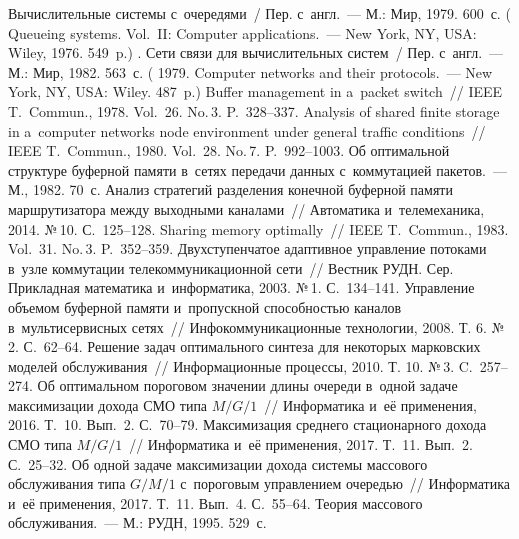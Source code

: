 \begin{multicols}{2}
{\small\frenchspacing
 {%
 \begin{thebibliography}{99}
 Вычислительные системы с~очередями~/ Пер. с~англ.~--- М.: 
Мир, 1979. 600~с. 
( {Queueing systems. Vol.~II: Computer applications}.~--- 
New York, NY, USA: Wiley, 1976. 549~p.)
. 
Сети связи для вычислительных систем~/ Пер. с~англ.~--- 
М.: Мир, 1982. 563~с. 
( 1979. 
{Computer networks and their protocols}.~--- New York, NY, USA: Wiley. 487~p.)
 Buffer management in a~packet switch~// IEEE T.~Commun., 
1978. Vol.~26. No.\,3. P.~328--337.
 Analysis of shared finite storage in a~computer 
networks node environment under general traffic conditions~// IEEE 
T.~Commun., 1980. Vol.~28. No.\,7. P.~992--1003.
 Об оптимальной структуре буферной 
памяти в~сетях передачи данных с~коммутацией пакетов.~--- М., 1982. 70~с. 
 Анализ стратегий разделения конечной буферной памяти 
маршрутизатора между выходными каналами~// Автоматика и~телемеханика, 
2014. №\,10. С.~125--128.
 Sharing memory optimally~// IEEE 
T.~Commun., 1983. Vol.~31. No.\,3. P.~352--359.
 Двухступенчатое адаптивное управление потоками в~узле 
коммутации телекоммуникационной сети~// Вестник РУДН. Сер.
Прикладная математика и~информатика, 2003. №\,1. С.~134--141.
 Управление объемом буферной памяти и~пропускной 
способностью каналов в~мультисервисных сетях~// 
Инфокоммуникационные технологии, 2008. Т. 6. №\,2. С.~62--64. 
 Решение задач оптимального синтеза для некоторых 
марковских моделей обслуживания~// Информационные процессы, 2010. 
Т. 10. №\,3. C.~257--274.
 Об оптимальном 
пороговом значении длины очереди в~одной задаче максимизации дохода 
СМО типа $M/G/1$~// Информатика и~её применения, 2016. Т.~10. Вып.~2. С.~70--79.
 Максимизация среднего стационарного дохода СМО типа 
$M/G/1$~// Информатика и~её применения, 2017. Т.~11. Вып.~2. С.~25--32. 
 Об одной задаче максимизации дохода 
системы массового обслуживания типа $G/M/1$ с~пороговым управлением 
очередью~// Информатика и~её применения, 2017. Т.~11. Вып.~4. С.~55--64.
 Теория массового обслуживания.~--- 
М.: РУДН, 1995. 529~с.
 \end{thebibliography}

 }
 }

\end{multicols}

